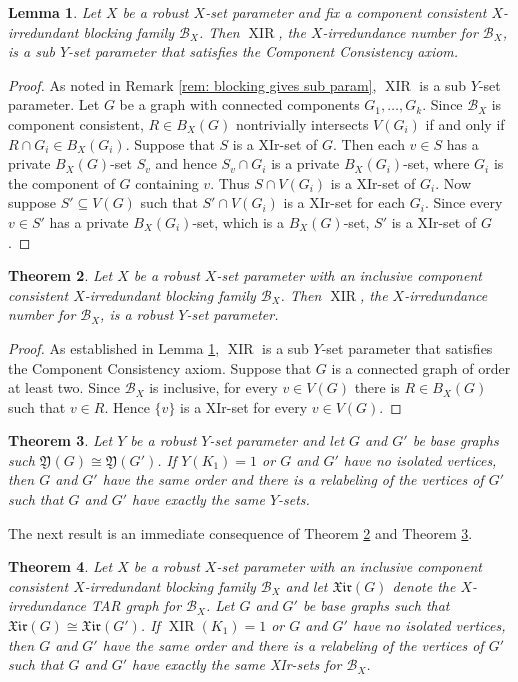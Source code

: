 \documentclass{article}
\numberwithin{figure}{section}
\numberwithin{table}{section}
\numberwithin{equation}{section}
\newtheorem{thm}{Theorem}[section]
\newtheorem{lem}[thm]{Lemma}
\theoremstyle{definition}
\theoremstyle{definition}
\theoremstyle{definition}
\newcommand{\B}{\mathcal{B}}
\newcommand{\bpf}{\begin{proof}}
\newcommand{\epf}{\end{proof}\ms}
\newcommand{\ms}{\medskip}
\newcommand{\xirtar}{\mathfrak{Xir}}
\DeclareMathOperator{\XIR}{XIR}
\newcommand{\ytar}{\mathfrak{Y}}
\begin{document}
 \begin{lem}\label{l:xirred-compconsist}
Let $X$ be a robust   $X$-set parameter  and fix  a component consistent $X$-irredundant blocking family $\B_X$.  Then $\XIR$, the $X$-irredundance number for $\B_X$,  is a sub $Y$-set parameter that satisfies the Component Consistency axiom.
\end{lem}
\bpf  
As noted in Remark \ref{rem: blocking gives sub param}, $\XIR$ is a sub $Y$-set parameter. Let $G$ be a graph with connected components $G_1, \dots, G_k$.  Since $\B_X$ is component consistent, $R\in B_{X}(G)$ nontrivially intersects $V(G_i)$ if and only if $R\cap G_i\in B_X(G_i)$. 
Suppose that $S$ is a XIr-set of $G$. Then each $v\in S$ has a private $B_X(G)$-set $S_v$ and hence $S_v \cap G_i$ is a private $B_X(G_i)$-set, where $G_i$ is the component of $G$ containing $v$. Thus $S\cap V(G_i)$ is a XIr-set of $G_i$.
Now suppose $S'\subseteq V(G)$ such that $S'\cap V(G_i)$ is a XIr-set for each $G_i$. Since  every $v\in S'$ has a private $B_X(G_i)$-set, which is a $B_X(G)$-set, $S'$ is a XIr-set of $G$.
 \epf



\begin{thm}\label{p:xirred-robust}
Let $X$ be a robust  $X$-set parameter with  an inclusive component consistent $X$-irredundant blocking family $\B_X$.  Then $\XIR$, the $X$-irredundance number for $\B_X$,   is a robust $Y$-set parameter.
\end{thm}
\bpf  
 As established in Lemma \ref{l:xirred-compconsist}, $\XIR$ is a sub $Y$-set parameter that satisfies the Component Consistency axiom. Suppose that $G$ is a connected graph  of order at least two. Since $\B_X$ is  inclusive, for every $v\in V(G)$ there is $R\in B_X(G)$ such that $v\in R$. Hence $\{v\}$ is a XIr-set for every $v\in V(G)$. 
 \epf



\begin{thm}\label{t:main-comp} {\rm\cite{XTAR-YTAR}}
Let $Y$ be a robust $Y$-set parameter and let $G$ and $G'$ be base graphs such $\ytar(G)\cong\ytar(G')$. If $Y(K_1)=1$ or $G$ and $G'$ have no isolated vertices, then $G$ and $G'$ have the same order and there is a relabeling of the vertices of $G'$ such that $G$ and $G'$ have exactly the same $Y$-sets.  
\end{thm}

  The next result is an immediate consequence of Theorem \ref{p:xirred-robust} and Theorem \ref{t:main-comp}.

\begin{thm}\label{t:xirred-main}
Let $X$ be a robust  $X$-set parameter with  an inclusive component consistent $X$-irredundant blocking family $\B_X$ and let $\xirtar(G)$ denote the $X$-irredundance TAR graph for $\B_X$. Let $G$ and $G'$ be  base graphs such  that $\xirtar(G)\cong\xirtar(G')$. If $\XIR(K_1)=1$ or $G$ and $G'$ have no isolated vertices, then $G$ and $G'$ have the same order and there is a relabeling of the vertices of $G'$ such that $G$ and $G'$ have exactly the same XIr-sets for $\B_X$.  
\end{thm}
\end{document}
